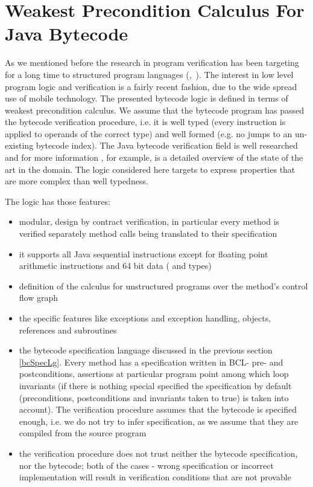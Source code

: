 
\section{Weakest Precondition Calculus For Java Bytecode}\label{wpbc}
As we mentioned before the research in program verification has been targeting for a long time to structured program languages (\cite{WPCDS},~\cite{DisDij}). 
The interest in low level program logic and verification is a fairly recent fashion, due to the wide spread use of mobile technology.
The presented bytecode logic is defined in terms of weakest precondition calculus. We assume 
that the bytecode program has passed the bytecode verification procedure, i.e. it is well typed 
(every instruction is applied to operands of the correct type) and well formed 
(e.g. no jumps to an un-existing bytecode index). The Java bytecode verification field is  well researched and 
for more information \cite{Ljbc}, for example, is a detailed overview of the state of the art in the domain. 
The logic considered here targets to express properties that are more complex than well typedness.

The logic has those features:
\begin{itemize}
\item modular, design by contract verification, in particular every method is verified separately method calls being translated to their specification 
\item it supports all Java sequential instructions except for floating point arithmetic instructions and 64 bit data ( and  types)
\item definition of the calculus for unstructured programs over the method's control flow graph
\item the specific features like exceptions and exception handling, objects, references and subroutines
\item the bytecode specification language discussed in the previous section \ref{bcSpecLg}. Every method has a specification written 
in BCL- pre- and postconditions, assertions at particular program point among 
which loop invariants (if there is nothing special specified the specification by default (preconditions, postconditions and invariants taken to true) is taken into account). The verification procedure assumes that the bytecode is specified enough, i.e. we do not try to infer specification, as we assume that they are compiled from the source program
\item the verification procedure does not trust neither the bytecode specification, nor the bytecode; both of the cases - wrong 
specification or incorrect implementation will result in verification conditions that are not provable 
\end{itemize}

